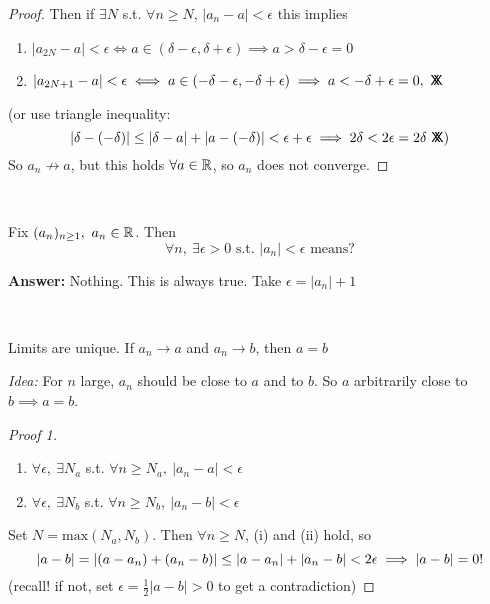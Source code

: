 \begin{example}
\begin{proof}
 Then if $\exists N$ s.t. $\forall n \geq N$, $|a_n - a| <\epsilon$ this implies
\begin{enumerate}
\item $|a_{2N} - a | < \epsilon \iff a \in (\delta - \epsilon, \delta + \epsilon)\implies a > \delta - \epsilon =0$ 
\item $|a_{2N+1} - a | < \epsilon\iff a \in (-\delta - \epsilon,-\delta + \epsilon) \implies a < -\delta + \epsilon = 0,~\mathsf{X}\mkern-8.5mu\mathsf{X}$ 
\end{enumerate}
(or use triangle inequality: \[|\delta - (-\delta)| \leq |\delta - a| + |a -(-\delta)| < \epsilon + \epsilon \implies 2\delta < 2\epsilon = 2\delta ~\mathsf{X}\mkern-8.5mu\mathsf{X}\text{)}\]
So $a_n \not\to a$, but this holds $\forall a \in \mathbb{R}$, so $a_n$ does not converge.
\end{proof}
\end{example}~

\begin{clicker}
Fix $(a_n)_{n\geq 1},~a_n \in \mathbb{R}$. Then \[\forall n,~\exists \epsilon >0 \text{ s.t. } |a_n| < \epsilon \text{ means?}\]

\textbf{Answer:} Nothing. This is always true. Take $\epsilon = |a_n| + 1$	
\end{clicker}~


\begin{theorem}
Limits are unique. If $a_n \to a$ and $a_n \to b$, then $a=b$	
\end{theorem}

\emph{Idea:} For $n$ large, $a_n$ should be close to $a$ and to $b$. So $a$ arbitrarily close to $b \implies a = b$. 

\begin{proof}[Proof 1]~
\begin{enumerate}
\item $\forall \epsilon,~\exists N_a$ s.t. $\forall n \geq N_a,~|a_n - a| < \epsilon$ 

\item $\forall \epsilon,~\exists N_b$ s.t. $\forall n \geq N_b,~|a_n - b| < \epsilon$
\end{enumerate}

Set $N = \mathrm{max}(N_a,N_b)$. Then $\forall n \geq N$, (i) and (ii) hold, so
\[|a - b| = |(a-a_n) + (a_n - b)| \leq |a - a_n| + |a_n - b| < 2\epsilon \implies |a-b| = 0!\qedhere\]
(recall! if not, set $\epsilon = \frac{1}{2}|a-b| >0$ to get a contradiction)
\end{proof}~


